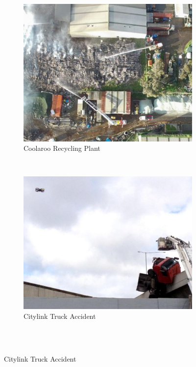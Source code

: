 \documentclass[capstone_report.tex]{subfiles}
\begin{document}
    \begin{figure}
        \centering
        \begin{subfigure}[b]{0.33\textwidth}
            \includegraphics[width=\textwidth]{imgs/coolaroo.jpg}
            \caption{Coolaroo Recycling Plant}
            \label{fig:coolaroo}
        \end{subfigure}
        ~ %
        \begin{subfigure}[b]{0.33\textwidth}
            \includegraphics[width=\textwidth]{imgs/truck.jpg}
            \caption{Citylink Truck Accident}
            \label{fig:truck}
        \end{subfigure}\\
        ~ %


\end{figure}
\end{document}

